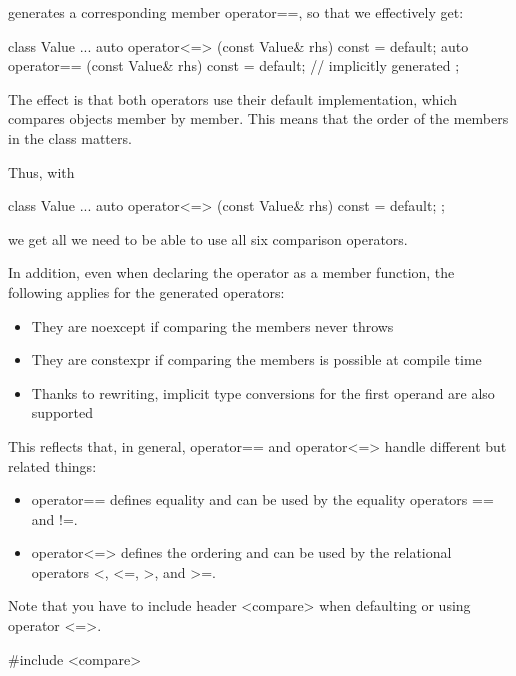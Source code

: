 generates a corresponding member operator==, so that we effectively get:

\begin{cpp}
class Value {
	...
	auto operator<=> (const Value& rhs) const = default;
	auto operator== (const Value& rhs) const = default; // implicitly generated
};
\end{cpp}

The effect is that both operators use their default implementation, which compares objects member by member. This means that the order of the members in the class matters.

Thus, with

\begin{cpp}
class Value {
	...
	auto operator<=> (const Value& rhs) const = default;
};
\end{cpp}

we get all we need to be able to use all six comparison operators.

In addition, even when declaring the operator as a member function, the following applies for the generated operators:

\begin{itemize}
\item
They are noexcept if comparing the members never throws

\item
They are constexpr if comparing the members is possible at compile time

\item
Thanks to rewriting, implicit type conversions for the first operand are also supported
\end{itemize}

This reflects that, in general, operator== and operator<=> handle different but related things:

\begin{itemize}
\item
operator== defines equality and can be used by the equality operators == and !=.

\item
operator<=> defines the ordering and can be used by the relational operators <, <=, >, and >=.
\end{itemize}

Note that you have to include header <compare> when defaulting or using operator <=>.

\begin{cpp}
#include <compare>
\end{cpp}

